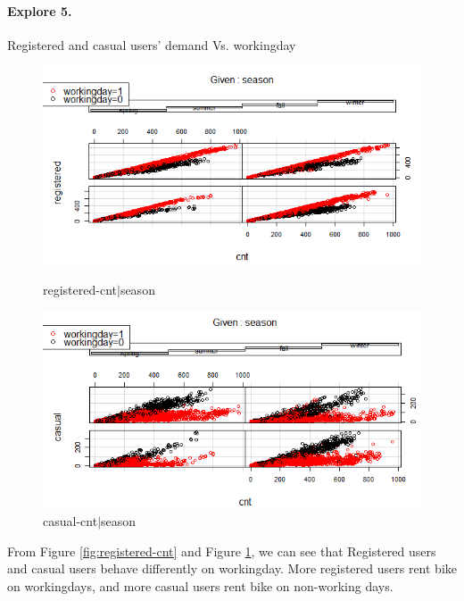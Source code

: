 \documentclass[12pt]{article}
\begin{document}
	\paragraph*{Explore 5.} Registered and casual users' demand Vs. workingday
	 \begin{figure}[H]
	 	\centering
	 	\begin{minipage}{.5\textwidth}
	 		\centering
	 		\includegraphics[width=\linewidth]{figures/registered_cnt_season.png}
	 		\caption{registered-cnt$|$season}
	 		\label{fig:registered-cnt}
	 	\end{minipage}%
	 	\begin{minipage}{.5\textwidth}
	 		\centering
	 		\includegraphics[width=\linewidth]{figures/casual_cnt_season.png}
	 		\caption{casual-cnt$|$season}
	 		\label{fig:casual-cnt}
	 	\end{minipage}
	 \end{figure}
	 From Figure \ref{fig:registered-cnt} and Figure \ref{fig:casual-cnt}, we can see that Registered users and casual users behave differently on workingday. More registered users rent bike on workingdays, and more casual users rent bike on non-working days.
\end{document}
